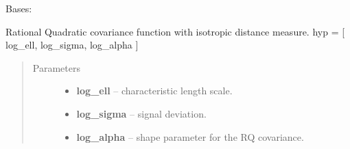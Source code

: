 \documentclass[letterpaper,10pt,english]{sphinxmanual}
\begin{document}
\begin{fulllineitems}
\label{pyGPs.Core:pyGPs.Core.cov.RQ}
Bases: 

Rational Quadratic covariance function with isotropic distance measure.
hyp = {[} log\_ell, log\_sigma, log\_alpha {]}
\begin{quote}\begin{description}
\item[{Parameters}] \leavevmode\begin{itemize}
\item {} 
\textbf{log\_ell} -- characteristic length scale.

\item {} 
\textbf{log\_sigma} -- signal deviation.

\item {} 
\textbf{log\_alpha} -- shape parameter for the RQ covariance.

\end{itemize}

\end{description}\end{quote}

\begin{fulllineitems}
\label{pyGPs.Core:pyGPs.Core.cov.RQ.getCovMatrix}
\end{fulllineitems}


\begin{fulllineitems}
\label{pyGPs.Core:pyGPs.Core.cov.RQ.getDerMatrix}
\end{fulllineitems}


\end{fulllineitems}

\end{document}
